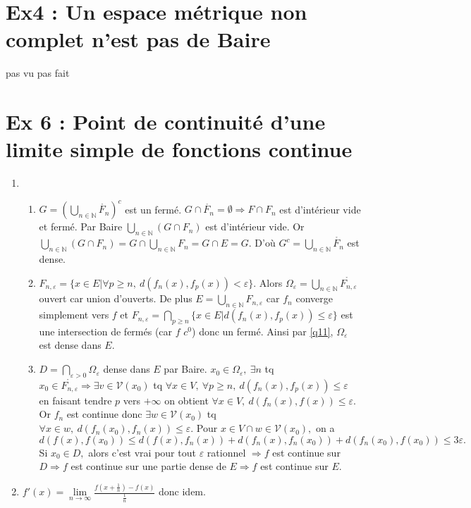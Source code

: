 \documentclass[a4paper]{article}
\begin{document}
\section*{Ex4 : Un espace métrique non complet n'est pas de Baire}

pas vu pas fait

\section*{Ex 6 : Point de continuité d'une limite simple de fonctions continue}
\begin{enumerate}
    \item 
    \begin{enumerate}
        \item\label{q11} $G=\left( {\bigcup\limits_{n\in \mathbb{N} } \mathring{F_n}} \right) ^c$ est un fermé. $G\cap \mathring{F_n}=\emptyset \Rightarrow F\cap F_n$ est d'intérieur vide et fermé. Par Baire $\bigcup\limits_{n\in \mathbb{N} } \left( G\cap F_n \right) $ est d'intérieur vide. Or $\bigcup\limits_{n\in \mathbb{N} } \left( G\cap F_n \right) =G\cap \bigcup\limits_{n\in \mathbb{N} } F_n=G\cap E=G$. D'où $G^c=\bigcup\limits_{n\in \mathbb{N} } \mathring{F_n}$ est dense. 

        \item $F_{n,\varepsilon }=\{x\in E| \forall p\ge n,\ d(f_n(x),f_p(x))<\varepsilon  \} $. Alors $\Omega_\varepsilon =\bigcup\limits_{n\in \mathbb{N} } \mathring{F_{n,\varepsilon }}$ ouvert car union d'ouverts. De plus $E=\bigcup\limits_{n\in \mathbb{N} } F_{n,\varepsilon }$ car $f_n$ converge simplement vers $f$ et $F_{n,\varepsilon }=\bigcap\limits_{p\ge n} \{x\in E| d(f_n(x),f_p(x))\le \varepsilon \} $ est une intersection de fermés (car $f$ $c^0$) donc un fermé. Ainsi par \ref{q11}, $\Omega_\varepsilon $ est dense dans $E.$ 

        \item $D=\bigcap\limits_{\varepsilon >0} \Omega_\varepsilon $ dense dans $E$ par Baire. $x_0\in \Omega_\varepsilon ,\ \exists n $ tq $x_0\in \mathring{F_{n,\varepsilon }} \Rightarrow \exists v\in \mathcal{V}(x_0)$ tq $\forall x\in V,\ \forall p\ge n,\ d(f_n(x),f_p(x))\le \varepsilon $ en faisant tendre $p$ vers $+\infty $ on obtient $\forall x\in V,\ d(f_n(x),f(x))\le \varepsilon  $. Or $f_n$ est continue donc $\exists w\in \mathcal{V}(x_0) $ tq $\forall x\in w,\ d(f_n(x_0),f_n(x))\le \varepsilon  $. Pour $x\in V\cap w\in \mathcal{V}(x_0),$ on a $d(f(x),f(x_0))\le d(f(x),f_n(x))+d(f_n(x),f_n(x_0))+d(f_n(x_0), f(x_0))\le 3\varepsilon .$ Si $x_0\in D,$ alors c'est vrai pour tout $\varepsilon $ rationnel $\Rightarrow f$ est continue sur $D\Rightarrow f$ est continue sur une partie dense de $E\Rightarrow f$ est continue sur $E.$ 

     \end{enumerate}
     \item $f'(x)=\lim\limits_{n \to \infty} \frac{f(x+\frac{1}{n})-f(x)}{\frac{1}{n}}$  donc idem.
\end{enumerate}
\end{document}

